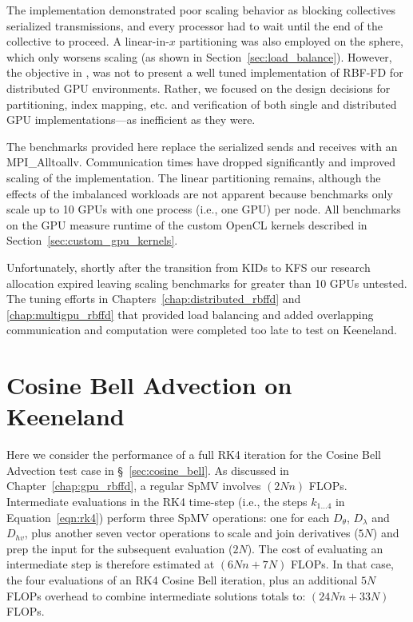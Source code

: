 The implementation demonstrated poor scaling behavior as blocking collectives serialized transmissions, and every processor had to wait until the end of the collective to proceed. A linear-in-$x$ partitioning was also employed on the sphere, which only worsens scaling (as shown in Section~\ref{sec:load_balance}). However, the objective in \cite{BolligFlyerErlebacher2012}, was not to present a well tuned implementation of RBF-FD for distributed GPU environments. Rather, we focused on the design decisions for partitioning, index mapping, etc. and verification of both single and distributed GPU implementations---as inefficient as they were. 

The benchmarks provided here replace the serialized sends and receives with an MPI\_Alltoallv. Communication times have dropped significantly and improved scaling of the implementation. The linear partitioning remains, although the effects of the imbalanced workloads are not apparent because benchmarks only scale up to 10 GPUs with one process (i.e., one GPU) per node. All benchmarks on the GPU measure runtime of the custom OpenCL kernels described in Section~\ref{sec:custom_gpu_kernels}.  

Unfortunately, shortly after the transition from KIDs to KFS our research allocation expired leaving scaling benchmarks for greater than 10 GPUs untested. The tuning efforts in Chapters~\ref{chap:distributed_rbffd} and \ref{chap:multigpu_rbffd} that provided load balancing and added overlapping communication and computation were completed too late to test on Keeneland. 


\section{Cosine Bell Advection on Keeneland} 

Here we consider the performance of a full RK4 iteration for the Cosine Bell Advection test case in \S~\ref{sec:cosine_bell}. As discussed in Chapter~\ref{chap:gpu_rbffd}, a regular SpMV involves $(2Nn)$ FLOPs. Intermediate evaluations in the RK4 time-step (i.e., the steps $k_{1 ... 4}$ in Equation~\ref{eqn:rk4}) perform three SpMV operations: one for each $D_{\theta}$, $D_{\lambda}$ and $D_{hv}$, plus another seven vector operations to scale and join derivatives ($5N$) and prep the input for the subsequent evaluation ($2N$). The cost of evaluating an intermediate step is therefore estimated at $(6Nn + 7N)$ FLOPs. In that case, the four evaluations of an RK4 Cosine Bell iteration, plus an additional $5N$ FLOPs overhead to combine intermediate solutions totals to: $(24Nn + 33N)$ FLOPs. 

